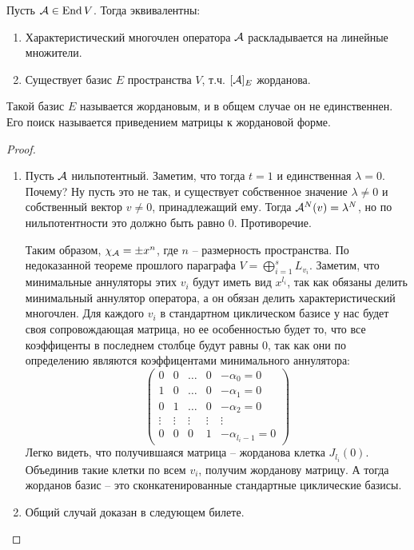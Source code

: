 \begin{theorem-non}
    Пусть $\mathcal{A} \in \operatorname{End} V$. Тогда эквивалентны: \begin{enumerate}
        \item Характеристический многочлен оператора $\mathcal{A}$ раскладывается на линейные множители.
        \item Существует базис $E$ пространства $V$, т.ч. $[\mathcal{A}]_E$ жорданова. 
    \end{enumerate}
    Такой базис $E$ называется жордановым, и в общем случае он не единственнен. 
    Его поиск называется приведением матрицы к жордановой форме.
\end{theorem-non}
\begin{proof} \quad 

    \begin{enumerate}
        \item Пусть $\mathcal{A}$ нильпотентный.
        Заметим, что тогда $t = 1$ и единственная $\lambda = 0$.
        Почему? Ну пусть это не так, и существует собственное значение $\lambda \neq 0$ и собственный вектор $v \neq 0$, принадлежащий ему.
        Тогда $\mathcal{A}^N(v) = \lambda^N$, но по нильпотентности это должно быть равно 0. Противоречие.
    
        Таким образом, $\chi_{\mathcal{A}} = \pm x^n$, где $n$ -- размерность пространства.
        По недоказанной теореме прошлого параграфа $V = \bigoplus\limits_{i=1}^s L_{v_i}$.
        Заметим, что минимальные аннуляторы этих $v_i$ будут иметь вид $x^{l_i}$, так как обязаны делить минимальный аннулятор оператора, а он обязан делить характеристический многочлен.
        Для каждого $v_i$ в стандартном циклическом базисе у нас будет своя сопровождающая матрица, но ее особенностью будет то, что все коэффиценты в последнем столбце будут равны 0, так как они по определению являются коэффицентами минимального аннулятора:
        \[
            \left(\begin{array}{ccccc}
            0 & 0 & \dots & 0 & -\alpha_0 = 0 \\ 
            1 & 0 & \dots & 0 & -\alpha_1 = 0 \\ 
            0 & 1 & \dots & 0 & -\alpha_2 = 0 \\ 
            \vdots & \vdots & \vdots & \vdots & \vdots \\ 
            0 & 0 & 0 & 1 & -\alpha_{l_i - 1} = 0
        \end{array}\right)    
        \]
        Легко видеть, что получившаяся матрица -- жорданова клетка $J_{l_i}(0)$. 
        Объединив такие клетки по всем $v_i$, получим жорданову матрицу. 
        А тогда жорданов базис -- это сконкатенированные стандартные циклические базисы.

        \item Общий случай доказан в следующем билете.
    \end{enumerate}
\end{proof}
